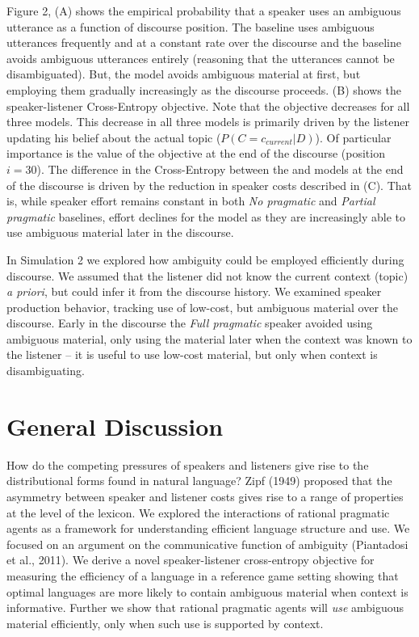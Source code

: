 \documentclass[10pt, letterpaper]{article}
\begin{document}
Figure 2, (A) shows the empirical probability that a speaker uses an
ambiguous utterance as a function of discourse position. The
 baseline uses ambiguous utterances frequently and at
a constant rate over the discourse and the 
baseline avoids ambiguous utterances entirely (reasoning that the
utterances cannot be disambiguated). But, the 
model avoids ambiguous material at first, but employing them gradually
increasingly as the discourse proceeds. (B) shows the speaker-listener
Cross-Entropy objective. Note that the objective decreases for all three
models. This decrease in all three models is primarily driven by the
listener updating his belief about the actual topic
(\(P(C=c_{current}|D)\)). Of particular importance is the value of the
objective at the end of the discourse (position \(i=30\)). The
difference in the Cross-Entropy between the  and
 models at the end of the discourse is driven by
the reduction in speaker costs described in (C). That is, while speaker
effort remains constant in both \textit{No pragmatic} and
\textit{Partial pragmatic} baselines, effort declines for the
 model as they are increasingly able to use
ambiguous material later in the discourse.\par

In Simulation 2 we explored how ambiguity could be employed efficiently
during discourse. We assumed that the listener did not know the current
context (topic) \textit{a priori}, but could infer it from the discourse
history. We examined speaker production behavior, tracking use of
low-cost, but ambiguous material over the discourse. Early in the
discourse the \textit{Full pragmatic} speaker avoided using ambiguous
material, only using the material later when the context was known to
the listener -- it is useful to use low-cost material, but only when
context is disambiguating.

\section{General Discussion}\label{general-discussion}

How do the competing pressures of speakers and listeners give rise to
the distributional forms found in natural language? Zipf (1949) proposed
that the asymmetry between speaker and listener costs gives rise to a
range of properties at the level of the lexicon. We explored the
interactions of rational pragmatic agents as a framework for
understanding efficient language structure and use. We focused on an
argument on the communicative function of ambiguity (Piantadosi et al.,
2011). We derive a novel speaker-listener cross-entropy objective for
measuring the efficiency of a language in a reference game setting
showing that optimal languages are more likely to contain ambiguous
material when context is informative. Further we show that rational
pragmatic agents will \emph{use} ambiguous material efficiently, only
when such use is supported by context.\par
\end{document}
